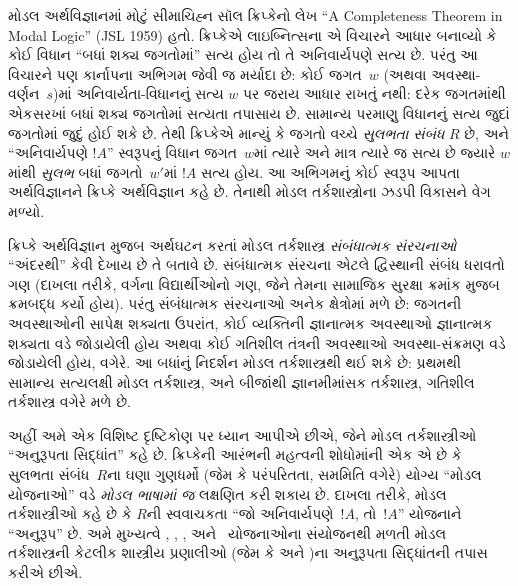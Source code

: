 \documentclass[../../../include/open-logic-section]{subfiles}
\begin{document}
મોડલ અર્થવિજ્ઞાનમાં મોટું સીમાચિહ્ન સૉલ ક્રિપ્કેનો લેખ
``A Completeness Theorem in Modal Logic'' (JSL 1959) હતો.
ક્રિપ્કેએ લાઇબ્નિત્સના એ વિચારને આધાર બનાવ્યો કે કોઈ વિધાન
``બધાં શક્ય જગતોમાં'' સત્ય હોય તો તે અનિવાર્યપણે સત્ય છે.
પરંતુ આ વિચારને પણ કાર્નાપના અભિગમ જેવી જ મર્યાદા છે:
કોઈ જગત~$w$ (અથવા અવસ્થા-વર્ણન~$s$)માં
અનિવાર્યતા-વિધાનનું સત્ય $w$ પર જરાય આધાર રાખતું નથી:
દરેક જગતમાંથી એકસરખાં બધાં શક્ય જગતોમાં સત્યતા તપાસાય છે.
સામાન્ય પરમાણુ વિધાનનું સત્ય જુદાં જગતોમાં જુદું હોઈ શકે છે.
તેથી ક્રિપ્કેએ માન્યું કે
જગતો વચ્ચે \emph{સુલભતા સંબંધ} $R$ છે, અને
``અનિવાર્યપણે $!A$'' સ્વરૂપનું વિધાન જગત~$w$માં ત્યારે અને
માત્ર ત્યારે જ સત્ય છે જ્યારે $w$માંથી \emph{સુલભ}
બધાં જગતો~$w'$માં $!A$ સત્ય હોય. આ અભિગમનું કોઈ સ્વરૂપ
આપતા અર્થવિજ્ઞાનને ક્રિપ્કે અર્થવિજ્ઞાન કહે છે. તેનાથી
મોડલ તર્કશાસ્ત્રોના ઝડપી વિકાસને વેગ મળ્યો.

ક્રિપ્કે અર્થવિજ્ઞાન મુજબ અર્થઘટન કરતાં મોડલ તર્કશાસ્ત્ર
\emph{સંબંધાત્મક સંરચનાઓ} ``અંદરથી'' કેવી દેખાય છે તે બતાવે છે.
સંબંધાત્મક સંરચના એટલે દ્વિસ્થાની સંબંધ ધરાવતો ગણ
(દાખલા તરીકે, વર્ગના વિદ્યાર્થીઓનો ગણ, જેને તેમના
સામાજિક સુરક્ષા ક્રમાંક મુજબ ક્રમબદ્ધ કર્યો હોય).
પરંતુ સંબંધાત્મક સંરચનાઓ અનેક ક્ષેત્રોમાં મળે છે:
જગતની અવસ્થાઓની સાપેક્ષ શક્યતા ઉપરાંત, કોઈ વ્યક્તિની
જ્ઞાનાત્મક અવસ્થાઓ જ્ઞાનાત્મક શક્યતા વડે જોડાયેલી હોય
અથવા કોઈ ગતિશીલ તંત્રની અવસ્થાઓ અવસ્થા-સંક્રમણ વડે
જોડાયેલી હોય, વગેરે. આ બધાંનું નિદર્શન મોડલ તર્કશાસ્ત્રથી
થઈ શકે છે: પ્રથમથી સામાન્ય સત્યલક્ષી મોડલ તર્કશાસ્ત્ર,
અને બીજાંથી જ્ઞાનમીમાંસક તર્કશાસ્ત્ર, ગતિશીલ તર્કશાસ્ત્ર
વગેરે મળે છે.

અહીં અમે એક વિશિષ્ટ દૃષ્ટિકોણ પર ધ્યાન આપીએ છીએ, જેને
મોડલ તર્કશાસ્ત્રીઓ ``અનુરૂપતા સિદ્ધાંત'' કહે છે. ક્રિપ્કેની
આરંભની મહત્વની શોધોમાંની એક એ છે કે સુલભતા સંબંધ~$R$ના
ઘણા ગુણધર્મો (જેમ કે પરંપરિતતા, સમમિતિ વગેરે) યોગ્ય
``મોડલ યોજનાઓ'' વડે \emph{મોડલ ભાષામાં જ} લક્ષણિત કરી
શકાય છે. દાખલા તરીકે, મોડલ તર્કશાસ્ત્રીઓ કહે છે કે
$R$ની સ્વવાચકતા ``જો અનિવાર્યપણે~$!A$, તો~$!A$''
યોજનાને ``અનુરૂપ'' છે. અમે મુખ્યત્વે , ,
,  અને~ યોજનાઓના સંયોજનથી મળતી
મોડલ તર્કશાસ્ત્રની કેટલીક શાસ્ત્રીય પ્રણાલીઓ (જેમ કે
 અને )ના અનુરૂપતા સિદ્ધાંતની તપાસ કરીએ છીએ.
\end{document}
